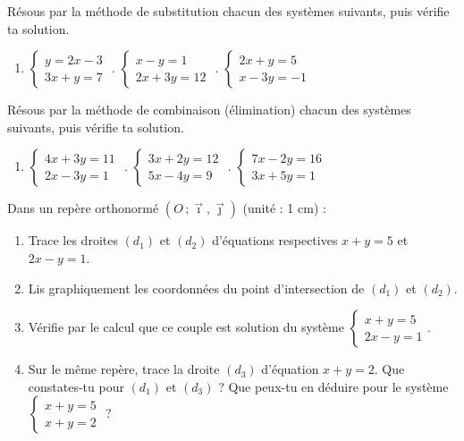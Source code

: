 \documentclass[11pt]{article}
\newcounter{popsec}
\newcounter{popsub}
\newcommand{\courssub}[1]{%
  \stepcounter{popsub}%
  \par\vspace{9pt}\noindent{\popxbold\fontsize{11.5}{13}\selectfont\color{popink}{\color{poporange}\thepopsec.\thepopsub}\hspace{6pt}#1}\par\nopagebreak\vspace{4pt}
}
\begin{document}
\courssub{Je m'entraîne}

\begin{exercice}
Résous par la méthode de substitution chacun des systèmes suivants, puis vérifie ta solution.
\begin{enumerate}
\item $\begin{cases} y = 2x - 3 \\ 3x + y = 7 \end{cases}$ . $\begin{cases} x - y = 1 \\ 2x + 3y = 12 \end{cases}$ . $\begin{cases} 2x + y = 5 \\ x - 3y = -1 \end{cases}$
\end{enumerate}
\end{exercice}

\begin{exercice}
Résous par la méthode de combinaison (élimination) chacun des systèmes suivants, puis vérifie ta solution.
\begin{enumerate}
\item $\begin{cases} 4x + 3y = 11 \\ 2x - 3y = 1 \end{cases}$ . $\begin{cases} 3x + 2y = 12 \\ 5x - 4y = 9 \end{cases}$ . $\begin{cases} 7x - 2y = 16 \\ 3x + 5y = 1 \end{cases}$
\end{enumerate}
\end{exercice}

\begin{exercice}
Dans un repère orthonormé $(O\,;\vec{\imath},\vec{\jmath})$ (unité : 1 cm) :
\begin{enumerate}
\item Trace les droites $(d_1)$ et $(d_2)$ d'équations respectives $x + y = 5$ et $2x - y = 1$.
\item Lis graphiquement les coordonnées du point d'intersection de $(d_1)$ et $(d_2)$.
\item Vérifie par le calcul que ce couple est solution du système $\begin{cases} x + y = 5 \\ 2x - y = 1 \end{cases}$.
\item Sur le même repère, trace la droite $(d_3)$ d'équation $x + y = 2$. Que constates-tu pour $(d_1)$ et $(d_3)$ ? Que peux-tu en déduire pour le système $\begin{cases} x + y = 5 \\ x + y = 2 \end{cases}$ ?
\end{enumerate}
\end{exercice}
\end{document}
